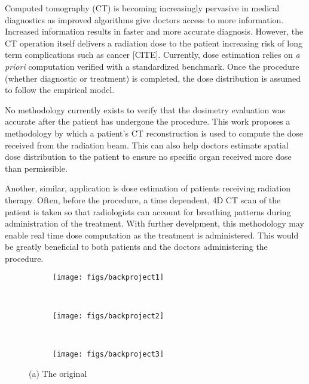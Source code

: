 

Computed tomography (CT) is becoming increasingly pervasive in medical diagnostics as improved algorithms give doctors access to more information. Increased information results in faster and more accurate diagnosis. However, the CT operation itself delivers a radiation dose to the patient increasing risk of long term complications such as cancer [CITE]. Currently, dose estimation relies on \textit{a priori} computation verified with a standardized benchmark. Once the procedure (whether diagnostic or treatment) is completed, the dose distribution is assumed to follow the empirical model.

No methodology currently exists to verify that the dosimetry evaluation was accurate after the patient has undergone the procedure. This work proposes a methodology by which a patient's CT reconstruction is used to compute the dose received from the radiation beam. This can also help doctors estimate spatial dose distribution to the patient to ensure no specific organ received more dose than permissible.

Another, similar, application is dose estimation of patients receiving radiation therapy. Often, before the procedure, a time dependent, 4D CT scan of the patient is taken so that radiologists can account for breathing patterns during administration of the treatment. With further develpment, this methodology may enable real time dose computation as the treatment is administered. This would be greatly beneficial to both patients and the doctors administering the procedure.

\begin{figure}
    \centering
    \begin{subfigure}[b]{0.38\textwidth}
        \texttt{[image: figs/backproject1]}
        \caption{}
        \label{fig:beamconexy}
    \end{subfigure}
    ~
    \begin{subfigure}[b]{0.19\textwidth}
        \texttt{[image: figs/backproject2]}
        \caption{}
        \label{fig:beamfanxy}
    \end{subfigure}
    ~
    \begin{subfigure}[b]{0.38\textwidth}
        \texttt{[image: figs/backproject3]}
        \caption{}
        \label{fig:subsweep_general3}
    \end{subfigure}
    \caption{(a) The original }\label{fig:backprojection}
\end{figure}

